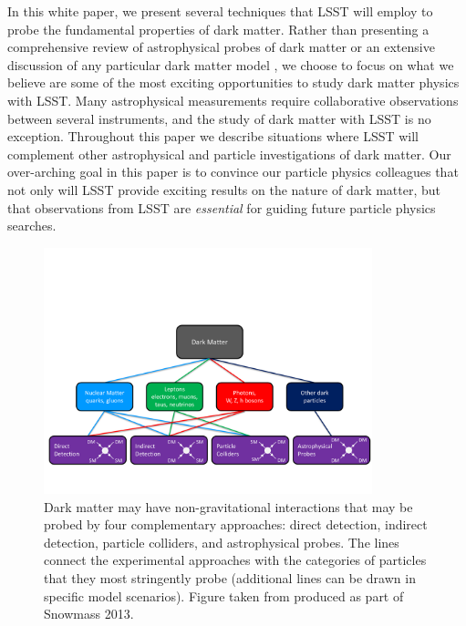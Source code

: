 In this white paper, we present several techniques that LSST will employ to probe the fundamental properties of dark matter. 
Rather than presenting a comprehensive review of astrophysical probes of dark matter  \citep[e.g.,][]{BuckleyPeter:2017} or an extensive discussion of any particular dark matter model \citep[e.g.,][]{Jain:2019}, we choose to focus on what we believe are some of the most exciting opportunities to study dark matter physics with LSST. 
Many astrophysical measurements require collaborative observations between several instruments, and the study of dark matter with LSST is no exception. 
Throughout this paper we describe situations where LSST will complement other astrophysical and particle investigations of dark matter.
Our over-arching goal in this paper is to convince our particle physics colleagues that not only will LSST provide exciting results on the nature of dark matter, but that observations from LSST are {\it essential} for guiding future particle physics searches.

\begin{figure}[t]
\centering
\includegraphics[width=0.85\textwidth]{figures/interactions.pdf}
\caption{
\label{fig:interactions}
Dark matter may have non-gravitational interactions that may be probed by four complementary approaches: 
direct detection, indirect detection, particle colliders, and astrophysical probes.
The lines connect the experimental approaches with the categories of particles that they most stringently probe (additional lines can be drawn in specific model scenarios). 
Figure taken from \citet{1305.1605} produced as part of Snowmass 2013.
}
\end{figure}


